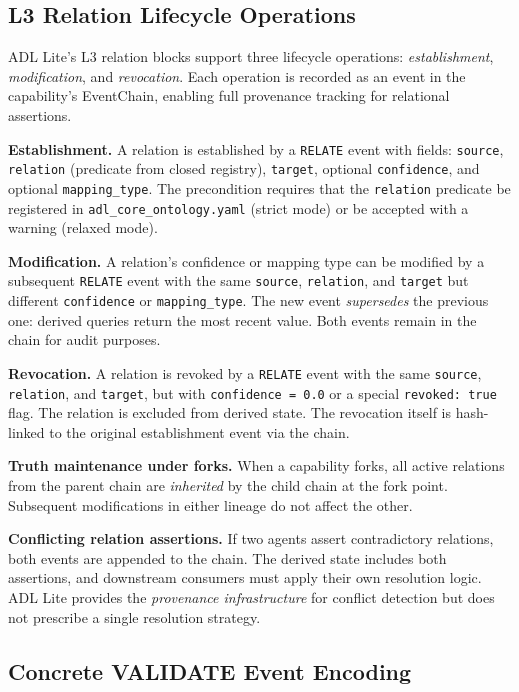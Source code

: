 \subsection{L3 Relation Lifecycle Operations}\label{app:l3-lifecycle}

ADL Lite's L3 relation blocks support three lifecycle operations: \emph{establishment}, \emph{modification}, and \emph{revocation}. Each operation is recorded as an event in the capability's EventChain, enabling full provenance tracking for relational assertions.

\textbf{Establishment.} A relation is established by a \texttt{RELATE} event with fields: \texttt{source}, \texttt{relation} (predicate from closed registry), \texttt{target}, optional \texttt{confidence}, and optional \texttt{mapping\_type}. The precondition requires that the \texttt{relation} predicate be registered in \texttt{adl\_core\_ontology.yaml} (strict mode) or be accepted with a warning (relaxed mode).

\textbf{Modification.} A relation's confidence or mapping type can be modified by a subsequent \texttt{RELATE} event with the same \texttt{source}, \texttt{relation}, and \texttt{target} but different \texttt{confidence} or \texttt{mapping\_type}. The new event \emph{supersedes} the previous one: derived queries return the most recent value. Both events remain in the chain for audit purposes.

\textbf{Revocation.} A relation is revoked by a \texttt{RELATE} event with the same \texttt{source}, \texttt{relation}, and \texttt{target}, but with \texttt{confidence = 0.0} or a special \texttt{revoked: true} flag. The relation is excluded from derived state. The revocation itself is hash-linked to the original establishment event via the chain.

\textbf{Truth maintenance under forks.} When a capability forks, all active relations from the parent chain are \emph{inherited} by the child chain at the fork point. Subsequent modifications in either lineage do not affect the other.

\textbf{Conflicting relation assertions.} If two agents assert contradictory relations, both events are appended to the chain. The derived state includes both assertions, and downstream consumers must apply their own resolution logic. ADL Lite provides the \emph{provenance infrastructure} for conflict detection but does not prescribe a single resolution strategy.

\subsection{Concrete VALIDATE Event Encoding}

